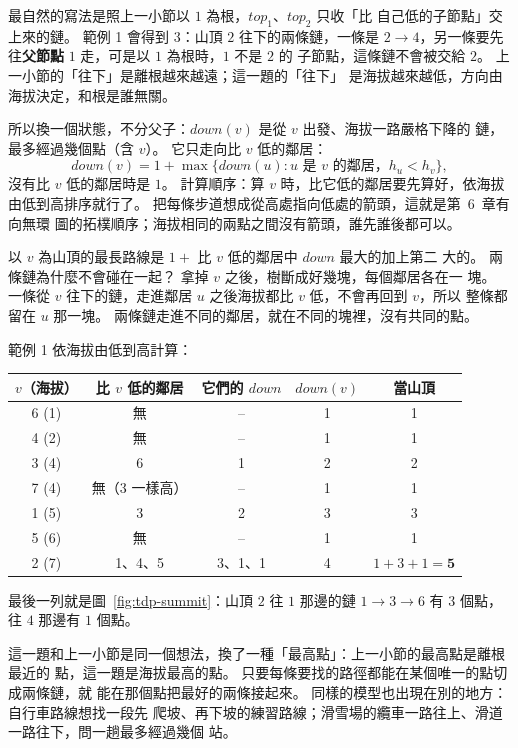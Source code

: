 最自然的寫法是照上一小節以 $1$ 為根，$\mathit{top}_1$、$\mathit{top}_2$ 只收「比
自己低的子節點」交上來的鏈。 範例 1 會得到 $3$：山頂 $2$ 往下的兩條鏈，一條是
$2 \to 4$，另一條要先往\textbf{父節點} $1$ 走，可是以 $1$ 為根時，$1$ 不是 $2$ 的
子節點，這條鏈不會被交給 $2$。 上一小節的「往下」是離根越來越遠；這一題的「往下」
是海拔越來越低，方向由海拔決定，和根是誰無關。

所以換一個狀態，不分父子：$\mathit{down}(v)$ 是從 $v$ 出發、海拔一路嚴格下降的
鏈，最多經過幾個點（含 $v$）。 它只走向比 $v$ 低的鄰居：
\[
\mathit{down}(v) = 1 + \max\{\mathit{down}(u) : u \text{ 是 } v \text{ 的鄰居，} h_u < h_v\},
\]
沒有比 $v$ 低的鄰居時是 $1$。 計算順序：算 $v$ 時，比它低的鄰居要先算好，依海拔
由低到高排序就行了。 把每條步道想成從高處指向低處的箭頭，這就是第~6~章有向無環
圖的拓樸順序；海拔相同的兩點之間沒有箭頭，誰先誰後都可以。

以 $v$ 為山頂的最長路線是 $1 + $ 比 $v$ 低的鄰居中 $\mathit{down}$ 最大的加上第二
大的。 兩條鏈為什麼不會碰在一起？ 拿掉 $v$ 之後，樹斷成好幾塊，每個鄰居各在一
塊。 一條從 $v$ 往下的鏈，走進鄰居 $u$ 之後海拔都比 $v$ 低，不會再回到 $v$，所以
整條都留在 $u$ 那一塊。 兩條鏈走進不同的鄰居，就在不同的塊裡，沒有共同的點。

範例 1 依海拔由低到高計算：

\begin{center}
\begin{tabular}{ccccc}
\toprule
$v$（海拔） & 比 $v$ 低的鄰居 & 它們的 $\mathit{down}$ & $\mathit{down}(v)$ & 當山頂 \\
\midrule
6 (1) & 無 & -- & 1 & 1 \\
4 (2) & 無 & -- & 1 & 1 \\
3 (4) & 6 & 1 & 2 & 2 \\
7 (4) & 無（3 一樣高） & -- & 1 & 1 \\
1 (5) & 3 & 2 & 3 & 3 \\
5 (6) & 無 & -- & 1 & 1 \\
2 (7) & 1、4、5 & 3、1、1 & 4 & $1 + 3 + 1 = \mathbf{5}$ \\
\bottomrule
\end{tabular}
\end{center}

最後一列就是圖~\ref{fig:tdp-summit}：山頂 $2$ 往 $1$ 那邊的鏈 $1 \to 3 \to 6$ 有
$3$ 個點，往 $4$ 那邊有 $1$ 個點。

這一題和上一小節是同一個想法，換了一種「最高點」：上一小節的最高點是離根最近的
點，這一題是海拔最高的點。 只要每條要找的路徑都能在某個唯一的點切成兩條鏈，就
能在那個點把最好的兩條接起來。 同樣的模型也出現在別的地方：自行車路線想找一段先
爬坡、再下坡的練習路線；滑雪場的纜車一路往上、滑道一路往下，問一趟最多經過幾個
站。

